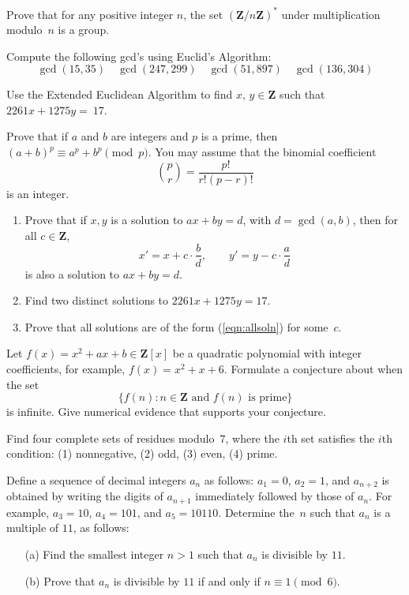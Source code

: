 \documentclass{exam}
\newcommand{\Z}{\mathbb Z}
\newcommand{\con}{\equiv}
\newcommand{\zmod}[1]{\Z/#1\Z{}}
\renewcommand{\mathbb}{\mathbf}
\begin{document}
\begin{questions}


	\question[10] Prove that for any positive integer $n$, the set $(\zmod{n})^*$ under multiplication modulo~$n$ is a group. 

	\question[5] Compute the following gcd's using Euclid's Algorithm:
	\[
	  \gcd(15,35)\quad
	  \gcd(247,299)\quad
	  \gcd(51,897) \quad
	  \gcd(136,304)
	\]

	\question[5] Use the Extended Euclidean Algorithm to find $x,\, y\in\Z$ such that $2261x + 1275y =~17$.

	\question[10] Prove that if $a$ and $b$ are integers and $p$ is a prime, then $(a+b)^p \con a^p + b^p\pmod{p}$.  You may assume that the binomial coefficient
	$$
	   \binom p r = \frac{p!}{r!(p-r)!}
	$$
	is an integer.


	\question[15]\label{ex:allsoln}
	\begin{enumerate}
		\item Prove that if $x, y$ is a solution to
		$ax + by = d$, with $d=\gcd(a,b)$,
		then for all $c\in\Z$,
		\begin{equation}\label{eqn:allsoln}
		   x' = x+ c\cdot\frac{b}{d}, \qquad
		   y' = y - c\cdot\frac{a}{d}
		\end{equation}
		is also a solution to $ax+by=d$.
		\item Find two distinct solutions to $2261x + 1275y = 17$.
		\item Prove that all solutions are of the form (\ref{eqn:allsoln})
		for some~$c$.
	\end{enumerate}

	\question[5]\label{ex:polrepconj}
	 Let $f(x)=x^2+ax+b \in\Z[x]$ be a quadratic
	polynomial with integer coefficients, for example, $f(x)=x^2+x+6$.
	Formulate a conjecture about when the set
	$$
	\{ f(n) : n\in \Z \text{ and $f(n)$ is prime}\}
	$$
	is infinite.  Give numerical evidence
	that supports your conjecture.

	\question[5]\label{ex:residues}
	Find four complete sets of residues modulo~$7$, where the
	$i$th set satisfies the $i$th condition:
	 (1) nonnegative, (2) odd, (3) even, (4) prime.


	\question[20] Define a sequence of decimal integers $a_n$ as follows: $a_1 = 0$, $a_2 = 1$, and $a_{n+2}$ is obtained by writing the digits of $a_{n+1}$ immediately followed by those of $a_n$.  For example, $a_3 = 10$, $a_4 = 101$, and $a_5 = 10110$. Determine the~$n$ such that $a_n$ is a multiple of $11$, as follows:
	\begin{enumerate}
		\item[(a)] Find the smallest integer $n>1$ such that $a_n$ is divisible by
		$11$.
		\item[(b)] Prove that $a_n$ is divisible by $11$ if and only if
		$n\con 1\pmod{6}$.
	\end{enumerate}


\end{questions}
\end{document}
